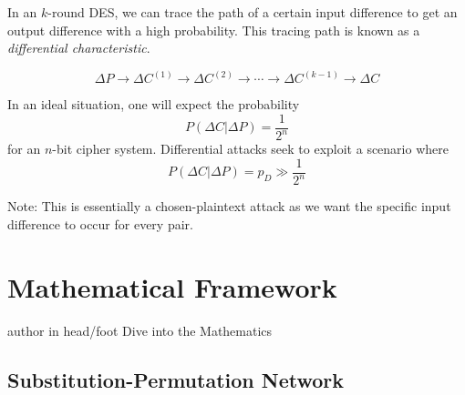\documentclass[9pt]{beamer}
\begin{document}
\begin{frame}
In an $k$-round DES, we can trace the path of a certain input difference to get an output difference with a high probability. \pause This tracing path is known as a {\it differential characteristic}.

\[ \Delta P \rightarrow \Delta C^{(1)} \rightarrow \Delta C^{(2)} \rightarrow \cdots \rightarrow \Delta C^{(k-1)} \rightarrow \Delta C \]

\pause In an ideal situation, one will expect the probability
\[ P \left(\Delta C | \Delta P \right) = \frac{1}{2^n} \]
for an $n$-bit cipher system. \pause Differential attacks seek to exploit a scenario where
\[ P \left(\Delta C | \Delta P \right) = p_D \gg \frac{1}{2^n} \]

\pause Note: This is essentially a chosen-plaintext attack as we want the specific input difference to occur for every pair.
\end{frame}

\section{Mathematical Framework}
\begin{frame}
\begin{beamercolorbox}[ht=2.5ex,dp=1.125ex,center,rounded=true,shadow=true]{author in head/foot}
Dive into the Mathematics
\end{beamercolorbox}
\end{frame}

\subsection{Substitution-Permutation Network}
\end{document}
